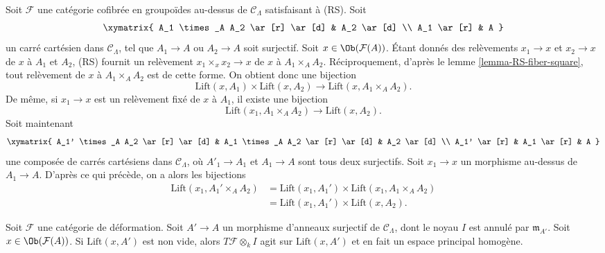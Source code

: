 \begin{remark}
\label{remark-lift-bijections}
Soit $\mathcal{F}$ une catégorie cofibrée en groupoïdes au-dessus de $\mathcal
C_\Lambda$ satisfaisant à (RS). Soit
$$
\xymatrix{
A_1 \times_A A_2 \ar[r] \ar[d] & A_2 \ar[d] \\
A_1 \ar[r] & A
}
$$
un carré cartésien dans $\mathcal{C}_\Lambda$, tel que $A_1 \to A$ ou
$A_2 \to A$ soit surjectif. Soit $x \in \Ob(\mathcal{F}(A))$. Étant donnés
des relèvements $x_1 \to x$ et $x_2 \to x$ de $x$ à $A_1$ et $A_2$, (RS)
fournit un relèvement $x_1 \times_x x_2 \to x$ de $x$ à
$A_1 \times_A A_2$. Réciproquement, d'après le lemme
\ref{lemma-RS-fiber-square}, tout relèvement de $x$ à
$A_1 \times_A A_2$ est de cette forme. On obtient donc une bijection
$$
\text{Lift}(x, A_1) \times \text{Lift}(x, A_2)
\longrightarrow
\text{Lift}(x, A_1 \times_A A_2).
$$
De même, si $x_1 \to x$ est un relèvement fixé de $x$ à $A_1$, il existe une
bijection
$$
\text{Lift}(x_1, A_1 \times_A A_2)
\longrightarrow
\text{Lift}(x, A_2).
$$
Soit maintenant
$$
\xymatrix{
A_1' \times_A A_2 \ar[r] \ar[d] & A_1 \times_A A_2 \ar[r] \ar[d] & A_2
\ar[d] \\
A_1' \ar[r] & A_1 \ar[r] & A
}
$$
une composée de carrés cartésiens dans $\mathcal{C}_\Lambda$, où
$A'_1 \to A_1$ et $A_1 \to A$ sont tous deux surjectifs. Soit $x_1 \to x$ un
morphisme au-dessus de $A_1 \to A$. D'après ce qui précède, on a alors les
bijections
\begin{align*}
\text{Lift}(x_1, A_1' \times_A A_2)
& = \text{Lift}(x_1, A_1') \times \text{Lift}(x_1, A_1 \times_A A_2) \\
& = \text{Lift}(x_1, A_1') \times \text{Lift}(x, A_2).
\end{align*}
\end{remark}

\begin{lemma}
\label{lemma-free-transitive-action}
Soit $\mathcal{F}$ une catégorie de déformation. Soit $A' \to A$ un
morphisme d'anneaux surjectif de $\mathcal{C}_\Lambda$, dont le noyau $I$
est annulé par $\mathfrak m_{A'}$. Soit $x \in \Ob(\mathcal{F}(A))$. Si
$\text{Lift}(x, A')$ est non vide, alors $T\mathcal{F} \otimes_k I$ agit sur
$\text{Lift}(x, A')$ et en fait un espace principal homogène.
\end{lemma}

